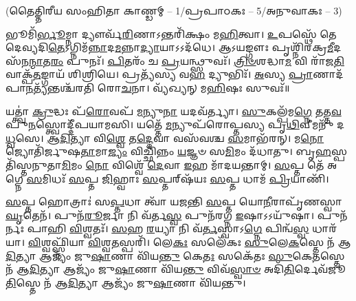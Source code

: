 \vspace{-1ex}
\centerline{\scriptsize (𑌤𑍈𑌤𑍍𑌤𑌿𑌰𑍀𑌯 𑌸𑌂𑌹𑌿𑌤𑌾 𑌕𑌾𑌣𑍍𑌡𑌮𑍍 – 1/𑌪𑍍𑌰𑌪𑌾𑌠𑌕𑌃 – 5/𑌅𑌨𑍁𑌵𑌾𑌕𑌃 – 3)}

𑌭𑍂𑌮𑌿᳴\-\ul{𑌰𑍍𑌭𑍂}\-𑌮𑍍𑌨𑌾 𑌦𑍍𑌯𑍗𑌰𑍍𑌵᳴\-\ul{𑌰𑌿}\-𑌣𑌾𑌽𑌨𑍍𑌤𑌰𑌿᳴𑌕𑍍𑌷𑌂 𑌮\-\ul{𑌹𑌿}\-𑌤𑍍𑌵𑌾। \ul{𑌉}\-𑌪𑌸𑍍𑌥𑍇᳴ 𑌤𑍇 𑌦𑍇𑌵𑍍𑌯𑌦𑌿\-\ul{𑌤𑍇}\-𑌽𑌗𑍍𑌨𑌿\-𑌮᳴\-\ul{𑌨𑍍𑌨𑌾}\-𑌦\-\ul{𑌮}\-𑌨𑍍𑌨𑌾\-\ul{𑌦𑍍𑌯𑌾}\-𑌯𑌾𑌽𑌽𑌦᳴𑌧𑍇।
𑌆𑌽𑌯𑌙𑍍𑌗𑍗𑌃 𑌪𑍃𑌶𑍍𑌨𑌿᳴𑌰𑌕𑍍𑌰\-\ul{𑌮𑍀}\-\-𑌦𑌸᳴𑌨\-\ul{𑌨𑍍𑌮𑌾}\-𑌤\-\ul{𑌰𑌂} 𑌪𑍁𑌨𑌃᳴। \ul{𑌪𑌿}\-𑌤𑌰𑌂᳴ 𑌚 \ul{𑌪𑍍𑌰}\-𑌯𑌨𑍍𑌥𑍍𑌸𑍁𑌵𑌃᳴।
\-\ul{𑌤𑍍𑌰𑌿}\-\-\ul{𑍞}\-𑌶𑌦𑍍𑌧𑌾\-\ul{𑌮} 𑌵𑌿 𑌰𑌾᳴𑌜\-\ul{𑌤𑌿} 𑌵𑌾𑌕𑍍𑌪᳴\-\ul{𑌤}\-𑌙𑍍𑌗𑌾𑌯᳴ 𑌶𑌿𑌶𑍍𑌰𑌿𑌯𑍇। 𑌪𑍍𑌰𑌤𑍍𑌯᳴𑌸𑍍𑌯 𑌵\-\ul{𑌹} 𑌦𑍍𑌯𑍁𑌭𑌿𑌃᳴। \ul{𑌅}\-𑌸𑍍𑌯 \ul{𑌪𑍍𑌰𑌾}\-𑌣𑌾𑌦᳴𑌪𑌾\-\ul{𑌨}\-𑌤𑍍𑌯᳴𑌨𑍍𑌤𑌶𑍍𑌚᳴𑌰𑌤𑌿 𑌰𑍋\-\ul{𑌚}\-𑌨𑌾।
𑌵𑍍𑌯᳴𑌖𑍍𑌯𑌨𑍍 𑌮\-\ul{𑌹𑌿}\-𑌷𑌃 𑌸𑍁𑌵𑌃᳴॥

𑌯𑌤𑍍𑌤𑍍𑌵𑌾॑ \ul{𑌕𑍍𑌰𑍁}\-𑌦𑍍𑌧𑌃 𑌪᳴\-\ul{𑌰𑍋}\-𑌵𑌪᳴ \ul{𑌮}\-𑌨𑍍𑌯𑍁\-\ul{𑌨𑌾} 𑌯𑌦𑌵᳴𑌰𑍍𑌤𑍍𑌯𑌾। \ul{𑌸𑍁}\-𑌕𑌲𑍍𑌪᳴𑌮\-\ul{𑌗𑍍𑌨𑍇} 𑌤𑌤𑍍𑌤\-\ul{𑌵} 𑌪𑍁\-\ul{𑌨}\-𑌸𑍍𑌤𑍍𑌵𑍋𑌦𑍍𑌦𑍀᳴𑌪𑌯𑌾𑌮𑌸𑌿।
𑌯𑌤𑍍𑌤𑍇᳴ \ul{𑌮}\-𑌨𑍍𑌯𑍁𑌪᳴𑌰𑍋𑌪𑍍𑌤𑌸𑍍𑌯 𑌪𑍃\-\ul{𑌥𑌿}\-𑌵𑍀𑌮𑌨𑍁᳴ 𑌦\-\ul{𑌧𑍍𑌵}\-𑌸𑍇। \ul{𑌆}\-\-\ul{𑌦𑌿}\-𑌤𑍍𑌯𑌾 𑌵𑌿\-\ul{𑌶𑍍𑌵𑍇} 𑌤\-\ul{𑌦𑍍𑌦𑍇}\-𑌵𑌾 𑌵𑌸᳴𑌵𑌶𑍍𑌚 \ul{𑌸}\-𑌮𑌾𑌭᳴𑌰𑌨𑍍।
𑌮\-\ul{𑌨𑍋} 𑌜𑍍𑌯𑍋𑌤𑌿᳴𑌰𑍍𑌜𑍁𑌷\-\ul{𑌤𑌾}\-𑌮𑌾\-\ul{𑌜𑍍𑌯𑌂} 𑌵𑌿𑌚𑍍𑌛𑌿᳴𑌨𑍍𑌨𑌂 \ul{𑌯}\-𑌜𑍍𑌞𑍞 𑌸\-\ul{𑌮𑌿}\-𑌮𑌂 𑌦᳴𑌧𑌾𑌤𑍁। 𑌬𑍃\-\ul{𑌹}\-𑌸𑍍𑌪𑌤𑌿᳴𑌸𑍍𑌤𑌨𑍁𑌤𑌾\-\ul{𑌮𑌿}\-𑌮𑌂 \ul{𑌨𑍋} 𑌵𑌿𑌶𑍍𑌵𑍇᳴ \ul{𑌦𑍇}\-𑌵𑌾 \ul{𑌇}\-𑌹 𑌮𑌾᳴𑌦𑌯𑌨𑍍𑌤𑌾𑌮𑍍।
 \ul{𑌸}\-𑌪𑍍𑌤 𑌤𑍇᳴ 𑌅𑌗𑍍𑌨𑍇 \ul{𑌸}\-𑌮𑌿𑌧𑌃᳴ \ul{𑌸}\-𑌪𑍍𑌤 \ul{𑌜𑌿}\-𑌹𑍍𑌵𑌾𑌃 \ul{𑌸}\-𑌪𑍍𑌤𑌰𑍍‌𑌷᳴𑌯𑌃 \ul{𑌸}\-𑌪𑍍𑌤 𑌧𑌾𑌮᳴ \ul{𑌪𑍍𑌰𑌿}\-𑌯𑌾𑌣𑌿᳴। 

\-\ul{𑌸}\-𑌪𑍍𑌤 𑌹𑍋𑌤𑍍𑌰𑌾𑌃॑ 𑌸\-\ul{𑌪𑍍𑌤}\-𑌧𑌾 𑌤𑍍𑌵𑌾᳴ 𑌯𑌜𑌨𑍍𑌤𑌿 \ul{𑌸}\-𑌪𑍍𑌤 𑌯𑍋\-\ul{𑌨𑍀}\-𑌰𑌾𑌪𑍃᳴𑌣𑌸𑍍𑌵𑌾 \ul{𑌘𑍃}\-𑌤𑍇𑌨᳴। 𑌪𑍁𑌨᳴\-\ul{𑌰𑍂}\-𑌰𑍍𑌜𑌾 𑌨𑌿 𑌵᳴𑌰𑍍𑌤\-\ul{𑌸𑍍𑌵} 𑌪𑍁𑌨᳴𑌰𑌗𑍍𑌨 \ul{𑌇}\-𑌷𑌾𑌽𑌽𑌯𑍁᳴𑌷𑌾। 𑌪𑍁𑌨᳴𑌰𑍍𑌨𑌃 𑌪𑌾𑌹𑌿 \ul{𑌵𑌿}\-𑌶𑍍𑌵𑌤𑌃᳴। \ul{𑌸}\-𑌹 \ul{𑌰}\-𑌯𑍍𑌯𑌾 𑌨𑌿 𑌵᳴\-\ul{𑌰𑍍𑌤}\-𑌸𑍍𑌵𑌾𑌽\-\ul{𑌗𑍍𑌨𑍇} 𑌪𑌿𑌨𑍍𑌵᳴\-\ul{𑌸𑍍𑌵} 𑌧𑌾𑌰᳴𑌯𑌾। \ul{𑌵𑌿}\-𑌶𑍍𑌵𑌫𑍍𑌸𑍍𑌨𑌿᳴𑌯𑌾 \ul{𑌵𑌿}\-𑌶𑍍𑌵\-\ul{𑌤}\-𑌸𑍍𑌪𑌰𑌿᳴। 𑌲𑍇\-\ul{𑌕𑌃} 𑌸𑌲𑍇᳴𑌕𑌃 \ul{𑌸𑍁}\-𑌲𑍇\-\ul{𑌕}\-𑌸𑍍𑌤𑍇 𑌨᳴ 𑌆\-\ul{𑌦𑌿}\-𑌤𑍍𑌯𑌾 𑌆𑌜𑍍𑌯𑌂᳴ 𑌜𑍁\-\ul{𑌷𑌾}\-𑌣𑌾 𑌵𑌿᳴𑌯\-\ul{𑌨𑍍𑌤𑍁} 𑌕𑍇\-\ul{𑌤𑌃} 𑌸𑌕𑍇᳴𑌤𑌃 \ul{𑌸𑍁}\-𑌕𑍇\-\ul{𑌤}\-𑌸𑍍𑌤𑍇 𑌨᳴ 𑌆\-\ul{𑌦𑌿}\-𑌤𑍍𑌯𑌾 𑌆𑌜𑍍𑌯𑌂᳴ 𑌜𑍁\-\ul{𑌷𑌾}\-𑌣𑌾 𑌵𑌿᳴𑌯\-\ul{𑌨𑍍𑌤𑍁} 𑌵𑌿𑌵᳴\-\ul{𑌸𑍍𑌵𑌾}\-\-\ul{𑍞} 𑌅𑌦𑌿᳴\-\ul{𑌤𑌿}\-𑌰𑍍𑌦𑍇𑌵᳴𑌜𑍂\-\ul{𑌤𑌿}\-𑌸𑍍𑌤𑍇 𑌨᳴ 𑌆\-\ul{𑌦𑌿}\-𑌤𑍍𑌯𑌾 𑌆𑌜𑍍𑌯𑌂᳴ 𑌜𑍁\-\ul{𑌷𑌾}\-𑌣𑌾 𑌵𑌿᳴𑌯𑌨𑍍𑌤𑍁।

